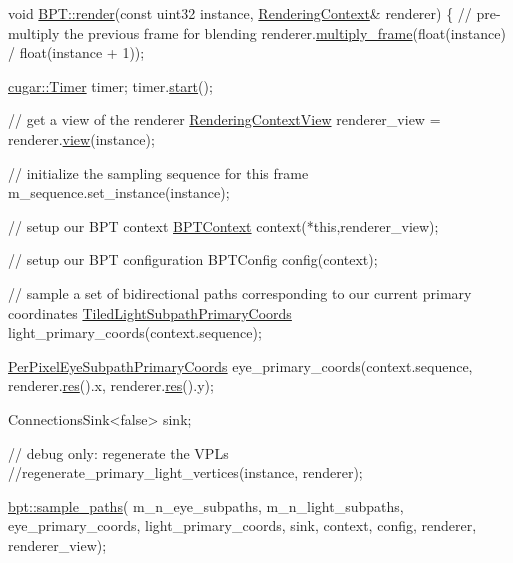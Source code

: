 \begin{DoxyCodeInclude}
\textcolor{keywordtype}{void} \hyperlink{struct_b_p_t_af9e940aca306f186cadfabc095590d88}{BPT::render}(\textcolor{keyword}{const} uint32 instance, \hyperlink{struct_rendering_context}{RenderingContext}& renderer)
\{
    \textcolor{comment}{// pre-multiply the previous frame for blending}
    renderer.\hyperlink{struct_rendering_context_a332a91e18bd96ae06973cc897c34ff07}{multiply\_frame}(\textcolor{keywordtype}{float}(instance) / \textcolor{keywordtype}{float}(instance + 1));

    \hyperlink{structcugar_1_1_timer}{cugar::Timer} timer;
    timer.\hyperlink{structcugar_1_1_timer_a337264814110dc99fd8b78b1267589d7}{start}();

    \textcolor{comment}{// get a view of the renderer}
    \hyperlink{struct_rendering_context_view}{RenderingContextView} renderer\_view = renderer.\hyperlink{struct_rendering_context_a591062fd1887b069a015ede456dcaa93}{view}(instance);
    
    \textcolor{comment}{// initialize the sampling sequence for this frame}
    m\_sequence.set\_instance(instance);
    
    \textcolor{comment}{// setup our BPT context}
    \hyperlink{struct_b_p_t_context}{BPTContext} context(*\textcolor{keyword}{this},renderer\_view);

    \textcolor{comment}{// setup our BPT configuration}
    BPTConfig config(context);
    
    \textcolor{comment}{// sample a set of bidirectional paths corresponding to our current primary coordinates}
    \hyperlink{struct_tiled_light_subpath_primary_coords}{TiledLightSubpathPrimaryCoords} light\_primary\_coords(context.sequence);

    \hyperlink{struct_per_pixel_eye_subpath_primary_coords}{PerPixelEyeSubpathPrimaryCoords} eye\_primary\_coords(context.sequence, 
      renderer.\hyperlink{struct_rendering_context_ad1a58510bdaf6f373080835abf5db2db}{res}().x, renderer.\hyperlink{struct_rendering_context_ad1a58510bdaf6f373080835abf5db2db}{res}().y);

    ConnectionsSink<false> sink;
    
    \textcolor{comment}{// debug only: regenerate the VPLs}
    \textcolor{comment}{//regenerate\_primary\_light\_vertices(instance, renderer);}

    \hyperlink{group___b_p_t_lib_ga4c1164d859ed146eb306e8b7b178c7e7}{bpt::sample\_paths}(
        m\_n\_eye\_subpaths,
        m\_n\_light\_subpaths,
        eye\_primary\_coords,
        light\_primary\_coords,
        sink,
        context,
        config,
        renderer,
        renderer\_view);


\end{DoxyCodeInclude}
